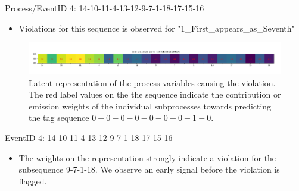 \documentclass{beamer}
\begin{document}
\begin{frame} %
\begin{block}{Process/EventID 4: 14-10-11-4-13-12-9-7-1-18-17-15-16}
		\begin{itemize}
                \scriptsize
				\item Violations for this sequence is observed for "1\_First\_appears\_as\_Seventh"
			\end{itemize}
\end{block}
\begin{figure}[!h]
            \includegraphics[scale = .23]{item_four.png}
            \centering
            \caption{\scriptsize Latent representation of the process variables causing the violation.  The red label values on the the sequence indicate the contribution or emission weights of the individual subprocesses towards predicting the tag sequence $0-0-0-0-0-0-0-1-0$.}
            \label{fig4}
\end{figure}
\begin{block}{EventID 4: 14-10-11-4-13-12-9-7-1-18-17-15-16}
		\begin{itemize}
            \scriptsize
			\item The weights on the representation strongly indicate a violation for the subsequence 9-7-1-18. We observe an early signal before the violation is flagged.
			\end{itemize}
\end{block}
\end{frame}
\end{document}
